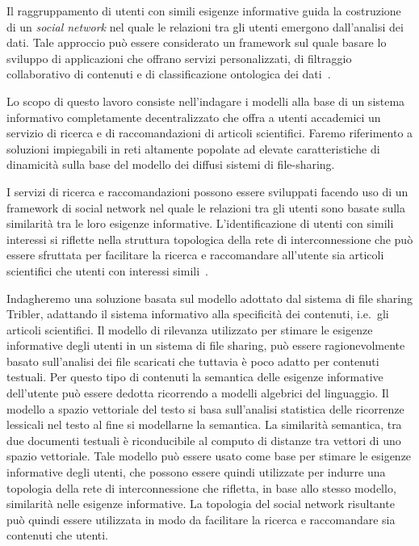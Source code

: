 Il raggruppamento di utenti con simili esigenze informative guida la costruzione di un \textit{social network} nel quale le relazioni tra gli utenti emergono dall'analisi dei dati. Tale approccio può essere considerato un framework sul quale basare lo sviluppo di applicazioni che offrano servizi personalizzati, di filtraggio collaborativo di contenuti e di classificazione ontologica dei dati~\cite{AHP+09}.

Lo scopo di questo lavoro consiste nell'indagare i modelli alla base di un sistema informativo completamente decentralizzato che offra a utenti accademici un servizio di ricerca e di raccomandazioni di articoli scientifici. Faremo riferimento a soluzioni impiegabili in reti altamente popolate ad elevate caratteristiche di dinamicità sulla base del modello dei diffusi sistemi di file-sharing.

I servizi di ricerca e raccomandazioni possono essere sviluppati facendo uso di un framework di social network nel quale le relazioni tra gli utenti sono basate sulla similarità tra le loro esigenze informative. L'identificazione di utenti con simili interessi si riflette nella struttura topologica della rete di interconnessione che può essere sfruttata per facilitare la ricerca e raccomandare all'utente sia articoli scientifici che utenti con interessi simili~\cite{HPK08}.

Indagheremo una soluzione basata sul modello adottato dal sistema di file sharing Tribler, adattando il sistema informativo alla specificità dei contenuti, i.e.\ gli articoli scientifici. Il modello di rilevanza utilizzato per stimare le esigenze informative degli utenti in un sistema di file sharing, può essere ragionevolmente basato sull'analisi dei file scaricati che tuttavia è poco adatto per contenuti testuali. Per questo tipo di contenuti la semantica delle esigenze informative dell'utente può essere dedotta ricorrendo a modelli algebrici del linguaggio. Il modello a spazio vettoriale del testo si basa sull'analisi statistica delle ricorrenze lessicali nel testo al fine si modellarne la semantica. La similarità semantica, tra due documenti testuali è riconducibile al computo di distanze tra vettori di uno spazio vettoriale. Tale modello può essere usato come base per stimare le esigenze informative degli utenti, che possono essere quindi utilizzate per indurre una topologia della rete di interconnessione che rifletta, in base allo stesso modello, similarità nelle esigenze informative. La topologia del social network risultante può quindi essere utilizzata in modo da facilitare la ricerca e raccomandare sia contenuti che utenti.

